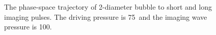 \begin{figure}[t]
 \centering
%
%
  \caption{
The phase-space trajectory of \unit{2}\micro\metre-diameter bubble to short and long imaging pulses.
The driving pressure is  \unit{75}\kilo\pascal\ and the imaging wave pressure is  \unit{100}\kilo\pascal.
   }
 \label{fig:Phase_Pert}
\end{figure}


% 
%
%
%


